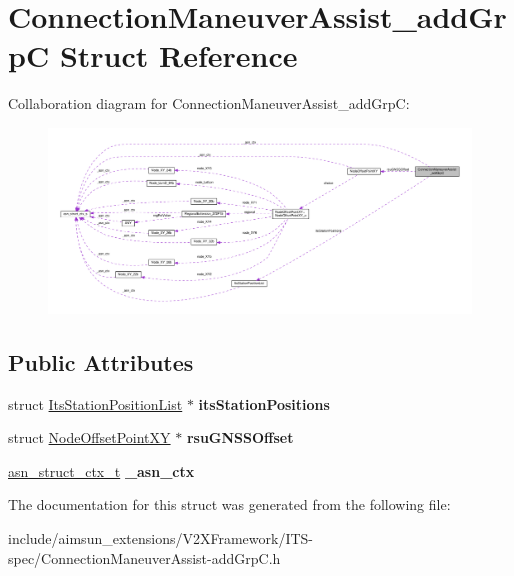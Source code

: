 \hypertarget{structConnectionManeuverAssist__addGrpC}{}\section{Connection\+Maneuver\+Assist\+\_\+add\+GrpC Struct Reference}
\label{structConnectionManeuverAssist__addGrpC}


Collaboration diagram for Connection\+Maneuver\+Assist\+\_\+add\+GrpC\+:\nopagebreak
\begin{figure}[H]
\begin{center}
\leavevmode
\includegraphics[width=350pt]{structConnectionManeuverAssist__addGrpC__coll__graph}
\end{center}
\end{figure}
\subsection*{Public Attributes}
\begin{DoxyCompactItemize}
\item 
struct \hyperlink{structItsStationPositionList}{Its\+Station\+Position\+List} $\ast$ {\bfseries its\+Station\+Positions}\hypertarget{structConnectionManeuverAssist__addGrpC_a27ff06cb85fad47712cc8053eb151d5e}{}\label{structConnectionManeuverAssist__addGrpC_a27ff06cb85fad47712cc8053eb151d5e}

\item 
struct \hyperlink{structNodeOffsetPointXY}{Node\+Offset\+Point\+XY} $\ast$ {\bfseries rsu\+G\+N\+S\+S\+Offset}\hypertarget{structConnectionManeuverAssist__addGrpC_a1b8cba23916d0528c2905401614126b0}{}\label{structConnectionManeuverAssist__addGrpC_a1b8cba23916d0528c2905401614126b0}

\item 
\hyperlink{structasn__struct__ctx__s}{asn\+\_\+struct\+\_\+ctx\+\_\+t} {\bfseries \+\_\+asn\+\_\+ctx}\hypertarget{structConnectionManeuverAssist__addGrpC_ae62418896df028c71e4658d1def24e87}{}\label{structConnectionManeuverAssist__addGrpC_ae62418896df028c71e4658d1def24e87}

\end{DoxyCompactItemize}


The documentation for this struct was generated from the following file\+:\begin{DoxyCompactItemize}
\item 
include/aimsun\+\_\+extensions/\+V2\+X\+Framework/\+I\+T\+S-\/spec/Connection\+Maneuver\+Assist-\/add\+Grp\+C.\+h\end{DoxyCompactItemize}
